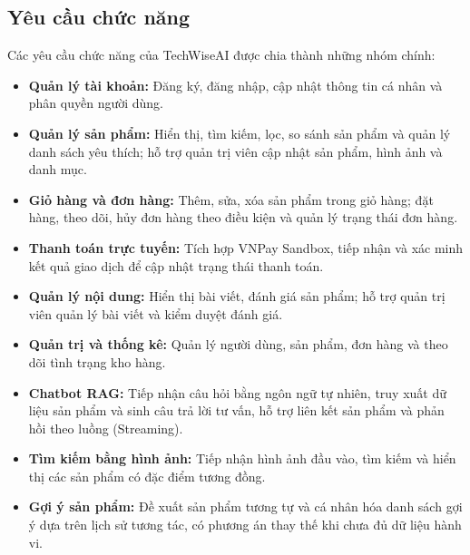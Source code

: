 \documentclass{report}
\begin{document}
\subsection{Yêu cầu chức năng}
Các yêu cầu chức năng của TechWiseAI được chia thành những nhóm chính:
\begin{itemize}
    \item \textbf{Quản lý tài khoản:} Đăng ký, đăng nhập, cập nhật thông tin cá nhân và phân quyền người dùng.
    \item \textbf{Quản lý sản phẩm:} Hiển thị, tìm kiếm, lọc, so sánh sản phẩm và quản lý danh sách yêu thích; hỗ trợ quản trị viên cập nhật sản phẩm, hình ảnh và danh mục.
    \item \textbf{Giỏ hàng và đơn hàng:} Thêm, sửa, xóa sản phẩm trong giỏ hàng; đặt hàng, theo dõi, hủy đơn hàng theo điều kiện và quản lý trạng thái đơn hàng.
    \item \textbf{Thanh toán trực tuyến:} Tích hợp VNPay Sandbox, tiếp nhận và xác minh kết quả giao dịch để cập nhật trạng thái thanh toán.
    \item \textbf{Quản lý nội dung:} Hiển thị bài viết, đánh giá sản phẩm; hỗ trợ quản trị viên quản lý bài viết và kiểm duyệt đánh giá.
    \item \textbf{Quản trị và thống kê:} Quản lý người dùng, sản phẩm, đơn hàng và theo dõi tình trạng kho hàng.
    \item \textbf{Chatbot RAG:} Tiếp nhận câu hỏi bằng ngôn ngữ tự nhiên, truy xuất dữ liệu sản phẩm và sinh câu trả lời tư vấn, hỗ trợ liên kết sản phẩm và phản hồi theo luồng (Streaming).
    \item \textbf{Tìm kiếm bằng hình ảnh:} Tiếp nhận hình ảnh đầu vào, tìm kiếm và hiển thị các sản phẩm có đặc điểm tương đồng.
    \item \textbf{Gợi ý sản phẩm:} Đề xuất sản phẩm tương tự và cá nhân hóa danh sách gợi ý dựa trên lịch sử tương tác, có phương án thay thế khi chưa đủ dữ liệu hành vi.
\end{itemize}
\end{document}
